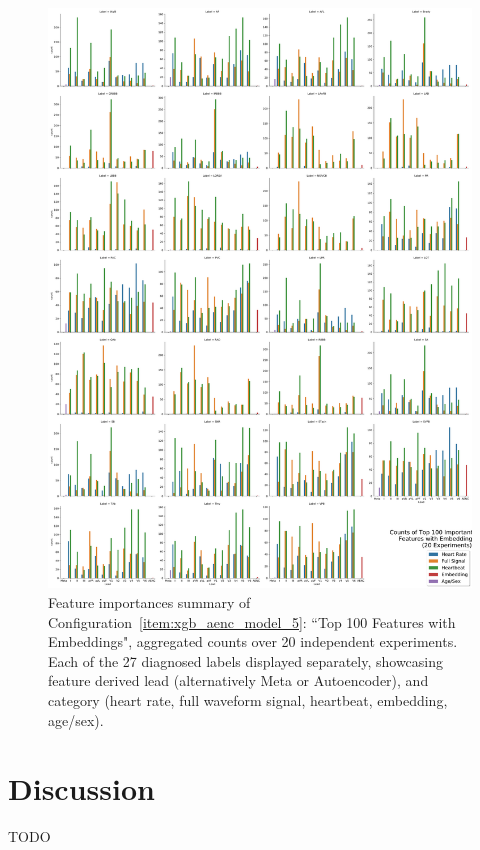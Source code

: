 \documentclass[\main/thesis.tex]{subfiles}
\begin{document}
\begin{figure}[t]
    \centering
    \includegraphics[width=\textwidth]{figure/top_100_feature_importances_all_w_embedding.pdf}
    \caption{Feature importances summary of Configuration~\ref{item:xgb_aenc_model_5}: ``Top 100 Features with Embeddings", aggregated counts over 20 independent experiments. Each of the 27 diagnosed labels displayed separately, showcasing feature derived lead (alternatively Meta or Autoencoder), and category (heart rate, full waveform signal, heartbeat, embedding, age/sex).}
    \label{fig:xgb_aenc_top_100_features_labelwise}
\end{figure}


\section{Discussion}
TODO

\end{document}
